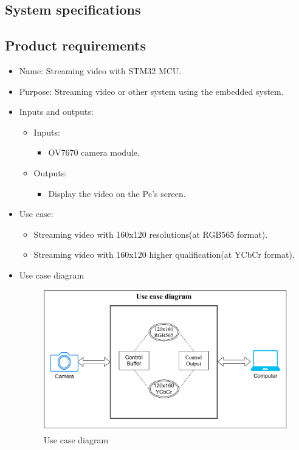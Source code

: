 \documentclass[D:/Latex/Internship/Report/Latex/Report.tex]{subfiles}
\begin{document}
	\setcounter{page}{1}
	\begin{otherlanguage}{english}
		\chapter{System specifications}
		\label{chap:chapter1}
			\section{Product requirements}
			\label{sec:Produc}
				\begin{itemize}
					\item Name: Streaming video with STM32 MCU.
					\item Purpose: Streaming video or other system using the embedded system.
					\item Inputs and outputs:
					\begin{itemize}
						\item Inputs: 				
						\begin{itemize}
							\item OV7670 camera module.
						\end{itemize}	
						\item Outputs:
						\begin{itemize}
							\item Display the video on the Pc's screen.
						\end{itemize}
					\end{itemize}

					\item Use case:
					\begin{itemize}
						\item Streaming video with 160x120 resolutions(at RGB565 format).		
						\item Streaming video with 160x120 higher qualification(at YCbCr format).		
					\end{itemize}
					\item Use case diagram
					\begin{figure}[!ht]
						\label{fig:UseCase}
						\centering 
						\includegraphics[scale = 0.75]{Usecase.pdf}
						\caption{Use case diagram}
					\end{figure}


\end{itemize}
\end{otherlanguage}
\end{document}
